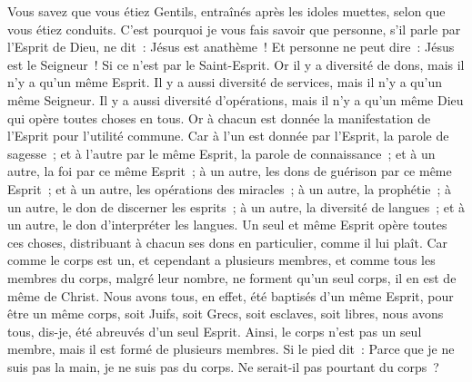 \begin{multicols}{2}
Vous savez que vous étiez Gentils, entraînés après les idoles muettes, selon que vous étiez conduits.
C'est pourquoi je vous fais savoir que personne, s'il parle par l'Esprit de Dieu, ne dit~: Jésus est anathème~! Et personne ne peut dire~: Jésus est le Seigneur~! Si ce n'est par le Saint-Esprit.
Or il y a diversité de dons, mais il n'y a qu'un même Esprit.
Il y a aussi diversité de services, mais il n'y a qu'un même Seigneur.
Il y a aussi diversité d'opérations, mais il n'y a qu'un même Dieu qui opère toutes choses en tous.
Or à chacun est donnée la manifestation de l'Esprit pour l'utilité commune.
Car à l'un est donnée par l'Esprit, la parole de sagesse~; et à l'autre par le même Esprit, la parole de connaissance~;
et à un autre, la foi par ce même Esprit~; à un autre, les dons de guérison par ce même Esprit~;
et à un autre, les opérations des miracles~; à un autre, la prophétie~; à un autre, le don de discerner les esprits~; à un autre, la diversité de langues~; et à un autre, le don d'interpréter les langues.
Un seul et même Esprit opère toutes ces choses, distribuant à chacun ses dons en particulier, comme il lui plaît.
Car comme le corps est un, et cependant a plusieurs membres, et comme tous les membres du corps, malgré leur nombre, ne forment qu'un seul corps, il en est de même de Christ.
Nous avons tous, en effet, été baptisés d'un même Esprit, pour être un même corps, soit Juifs, soit Grecs, soit esclaves, soit libres, nous avons tous, dis-je, été abreuvés d'un seul Esprit.
Ainsi, le corps n'est pas un seul membre, mais il est formé de plusieurs membres.
Si le pied dit~: Parce que je ne suis pas la main, je ne suis pas du corps. Ne serait-il pas pourtant du corps~?

\end{multicols}
